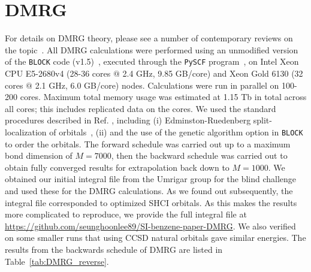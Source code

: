\documentclass[journal=jcp,manuscript=suppinfo]{achemso}
\begin{document}
\section{DMRG}

For details on DMRG theory, please see a number of contemporary reviews on the topic~\cite{chan_dmrg_2011,wouters_dmrg_2014,knecht_dmrg_2016}. All DMRG calculations were performed using an unmodified version of the {\texttt{BLOCK}} code (v1.5)~\cite{chan_head_gordon_dmrg_jcp_2002,chan_dmrg_jcp_2004,chan_polyacetylenes_jcp_2008,sharma_chan_dmrg_2012,chan_dmrg_2015}, executed through the {\texttt{PySCF}} program~\cite{pyscf_prog,pyscf_wires_2018,pyscf_jcp_2020}, on Intel Xeon CPU E5-2680v4 (28-36 cores $@$ 2.4 GHz, 9.85 GB/core) and Xeon Gold 6130 (32 cores $@$ 2.1 GHz, 6.0 GB/core) nodes. Calculations were run in parallel on 100-200 cores. Maximum total memory usage was estimated at 1.15 Tb in total across all cores; this includes
replicated data on the cores. We used the standard procedures described in Ref. , including (i) Edminston-Ruedenberg split-localization of orbitals~\cite{edmiston_ruedenberg_rev_mod_phys_1963}, (ii) and the use of the genetic algorithm option in \texttt{BLOCK} to order the orbitals. The forward schedule was carried out up to a maximum bond dimension of $M=7000$, then the backward schedule was carried out to obtain fully converged results for extrapolation back down to $M=1000$.
We obtained our initial integral file from the Umrigar group for the blind challenge and used these for the DMRG calculations.
As we found out subsequently, the integral file corresponded to optimized SHCI orbitals. As this makes the results more complicated to reproduce,
we provide the full integral file at \url{https://github.com/seunghoonlee89/SI-benzene-paper-DMRG}. We also
verified on some smaller runs that using CCSD natural orbitals gave similar energies. The results from the backwards schedule of DMRG are listed in Table~\ref{tab:DMRG_reverse}.\\
\end{document}
